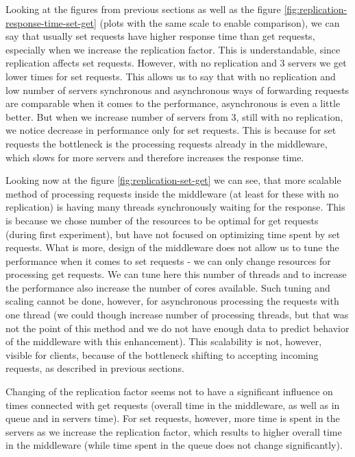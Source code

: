 \documentclass[11pt]{article}
\begin{document}
Looking at the figures from previous sections as well as the figure
\ref{fig:replication-response-time-set-get} (plots with the same scale to enable comparison), we can say that usually set requests have higher response time than get requests, especially when we increase the replication factor. This is understandable, since replication affects set requests. However, with no replication and 3 servers we get lower times for set requests. This allows us to say that with no replication and low number of servers synchronous and asynchronous ways of forwarding requests are comparable when it comes to the performance, asynchronous is even a little better. But when we increase number of servers from 3, still with no replication, we notice decrease in performance only for set requests. This is because for set requests the bottleneck is the processing requests already in the middleware, which slows for more servers and therefore increases the response time. 

Looking now at the figure \ref{fig:replication-set-get} we can see, that more scalable method of processing requests inside the middleware (at least for these with no replication) is having many threads synchronously waiting for the response. This is because we chose number of the resources to be optimal for get requests (during first experiment), but have not focused on optimizing time spent by set requests. What is more, design of the middleware does not allow us to tune the performance when it comes to set requests - we can only change resources for processing get requests.  We can tune here this number of threads and to increase the performance also increase the number of cores available. Such tuning and scaling cannot be done, however, for asynchronous processing the requests with one thread (we could though increase number of processing threads, but that was not the point of this method and we do not have enough data to predict behavior of the middleware with this enhancement). This scalability is not, however, visible for clients, because of the bottleneck shifting to accepting incoming requests, as described in previous sections.

Changing of the replication factor seems not to have a significant influence on times connected with get requests (overall time in the middleware, as well as in queue and in servers time). For set requests, however, more time is spent in the servers as we increase the replication factor, which results to higher overall time in the middleware (while time spent in the queue does not change significantly).
\end{document}
